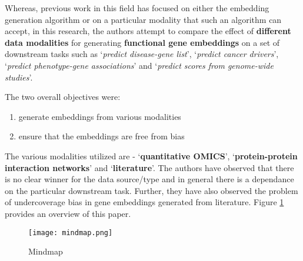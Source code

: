 \begin{sloppypar*}
    Whereas, previous work in this field has focused on either the embedding
    generation algorithm or on a particular modality that such an algorithm can
    accept, in this research, the authors attempt to compare the effect of
    \textbf{different data modalities} for generating \textbf{functional gene
    embeddings} on a set of downstream tasks such as `\textit{predict disease-gene
    list}', `\textit{predict cancer drivers}', `\textit{predict phenotype-gene
    associations}' and `\textit{predict scores from genome-wide studies}'. \hfill \break

    \noindent The two overall objectives were:
    \begin{enumerate}
        \item generate embeddings from various modalities
        \item ensure that the embeddings are free from bias
    \end{enumerate}
    
    \noindent The various modalities utilized are - `\textbf{quantitative OMICS}', 
    `\textbf{protein-protein interaction networks}' and `\textbf{literature}'. The 
    authors have observed that there is no clear winner for the data source/type
    and in general there is a dependance on the particular downstream task. Further,
    they have also observed the problem of undercoverage bias in gene embeddings
    generated from literature. Figure \ref{fig:mindmap} provides an overview of
    this paper.

    \begin{figure}
        \centering
        \texttt{[image: mindmap.png]}
        \caption{Mindmap}
        \label{fig:mindmap}
    \end{figure}
\end{sloppypar*}